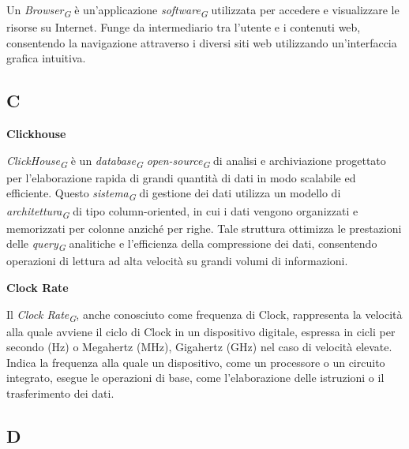 \vspace{0.1cm}

Un \textit{Browser}\textsubscript{\textit{G}} è un'applicazione \textit{software}\textsubscript{\textit{G}} utilizzata per accedere e visualizzare le risorse su Internet. Funge da intermediario tra l'utente e i contenuti web, consentendo la navigazione attraverso i diversi siti web utilizzando un'interfaccia grafica intuitiva. 

\subsection{C}

\textbf{Clickhouse}

\vspace{0.1cm}

\textit{ClickHouse}\textsubscript{\textit{G}} è un \textit{database}\textsubscript{\textit{G}} \textit{open-source}\textsubscript{\textit{G}} di analisi e archiviazione progettato per l'elaborazione rapida di grandi quantità di dati in modo scalabile ed efficiente. Questo \textit{sistema}\textsubscript{\textit{G}} di gestione dei dati utilizza un modello di \textit{architettura}\textsubscript{\textit{G}} di tipo column-oriented, in cui i dati vengono organizzati e memorizzati per colonne anziché per righe. Tale struttura ottimizza le prestazioni delle \textit{query}\textsubscript{\textit{G}} analitiche e l'efficienza della compressione dei dati, consentendo operazioni di lettura ad alta velocità su grandi volumi di informazioni. 

\vspace{0.4cm}

\textbf{Clock Rate}

\vspace{0.1cm}

Il \textit{Clock Rate}\textsubscript{\textit{G}}, anche conosciuto come frequenza di Clock, rappresenta la velocità alla quale avviene il ciclo di Clock in un dispositivo digitale, espressa in cicli per secondo (Hz) o Megahertz (MHz), Gigahertz (GHz) nel caso di velocità elevate. Indica la frequenza alla quale un dispositivo, come un processore o un circuito integrato, esegue le operazioni di base, come l'elaborazione delle istruzioni o il trasferimento dei dati. 

\subsection{D}

